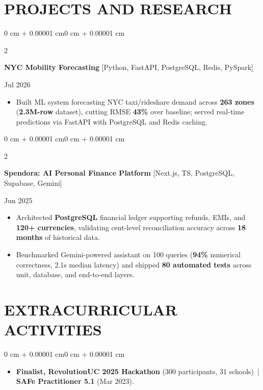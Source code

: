 \documentclass[10pt, letterpaper]{article}
\newenvironment{highlights}{
    \begin{itemize}[
        topsep=0.10 cm,
        parsep=0.06 cm,
        partopsep=0pt,
        itemsep=0.06 cm,
        leftmargin=12pt
    ]
}{
    \end{itemize}
}
\newenvironment{onecolentry}{
    \begin{adjustwidth}{0 cm + 0.00001 cm}{0 cm + 0.00001 cm}
}{
    \end{adjustwidth}
}
\newenvironment{twocolentry}[2][]{
    \onecolentry
    \def\secondColumn{#2}
    \setcolumnwidth{\fill, 4.5 cm}
    \begin{paracol}{2}
}{
    \switchcolumn \raggedleft \secondColumn
    \end{paracol}
    \endonecolentry
}
\begin{document}
\section{PROJECTS AND RESEARCH}
\begin{twocolentry}{Jul 2026}
\textbf{NYC Mobility Forecasting} [Python, FastAPI, PostgreSQL, Redis, PySpark]
\end{twocolentry}
\begin{highlights}
  \item Built ML system forecasting NYC taxi/rideshare demand across \textbf{263 zones} (\textbf{2.3M-row} dataset), cutting RMSE \textbf{43\%} over baseline; served real-time predictions via FastAPI with PostgreSQL and Redis caching.
\end{highlights}

\vspace{0.12 cm}

\begin{twocolentry}{Jun 2025}
\textbf{Spendora: AI Personal Finance Platform} [Next.js, TS, PostgreSQL, Supabase, Gemini]
\end{twocolentry}
\begin{highlights}
  \item Architected \textbf{PostgreSQL} financial ledger supporting refunds, EMIs, and \textbf{120+ currencies}, validating cent-level reconciliation accuracy across \textbf{18 months} of historical data.
  \item Benchmarked Gemini-powered assistant on 100 queries (\textbf{94\%} numerical correctness, 2.1s median latency) and shipped \textbf{80 automated tests} across unit, database, and end-to-end layers.
\end{highlights}

\section{EXTRACURRICULAR ACTIVITIES}
\begin{onecolentry}
\begin{highlights}
  \item \textbf{Finalist, RevolutionUC 2025 Hackathon} (300 participants, 31 schools) \,|\, \textbf{SAFe Practitioner 5.1} (Mar 2023).
\end{highlights}
\end{onecolentry}
\end{document}
